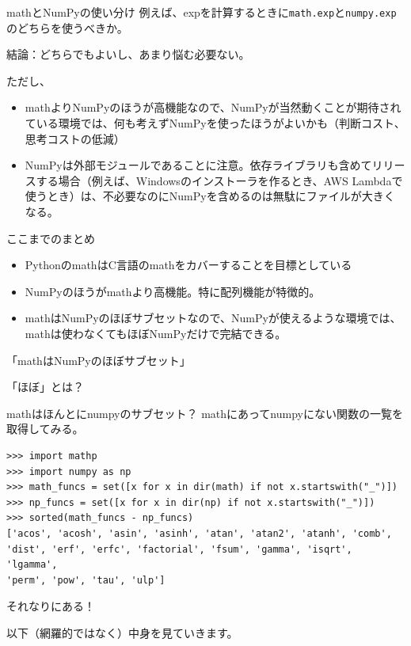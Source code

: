 \documentclass[unicode,lualatex,aspectratio=169]{beamer}
\begin{document}
\begin{frame}[fragile]{mathとNumPyの使い分け}
  例えば、expを計算するときに{\tt math.exp}と{\tt numpy.exp}のどちらを使うべきか。\vspace{1cm}


結論：どちらでもよいし、あまり悩む必要ない。

ただし、
  \begin{itemize}
  \item mathよりNumPyのほうが高機能なので、NumPyが当然動くことが期待されている環境では、何も考えずNumPyを使ったほうがよいかも（判断コスト、思考コストの低減）
  \item NumPyは外部モジュールであることに注意。依存ライブラリも含めてリリースする場合（例えば、Windowsのインストーラを作るとき、AWS Lambdaで使うとき）は、不必要なのにNumPyを含めるのは無駄にファイルが大きくなる。
  \end{itemize}
\end{frame}
\begin{frame}[fragile]{ここまでのまとめ}
  \begin{itemize}
  \item PythonのmathはC言語のmathをカバーすることを目標としている
  \item NumPyのほうがmathより高機能。特に配列機能が特徴的。
  \item mathはNumPyのほぼサブセットなので、NumPyが使えるような環境では、mathは使わなくてもほぼNumPyだけで完結できる。
  \end{itemize}
\end{frame}
\begin{frame}
  「mathはNumPyのほぼサブセット」

  
  「ほぼ」とは？
\end{frame}
\begin{frame}[fragile]{mathはほんとにnumpyのサブセット？}
mathにあってnumpyにない関数の一覧を取得してみる。
{\fontsize{6pt}{6pt}\selectfont    
\begin{verbatim}
>>> import mathp
>>> import numpy as np
>>> math_funcs = set([x for x in dir(math) if not x.startswith("_")])
>>> np_funcs = set([x for x in dir(np) if not x.startswith("_")])
>>> sorted(math_funcs - np_funcs)
['acos', 'acosh', 'asin', 'asinh', 'atan', 'atan2', 'atanh', 'comb', 
'dist', 'erf', 'erfc', 'factorial', 'fsum', 'gamma', 'isqrt', 'lgamma',
'perm', 'pow', 'tau', 'ulp']
\end{verbatim}
}
それなりにある！

以下（網羅的ではなく）中身を見ていきます。
\end{frame}
\end{document}
